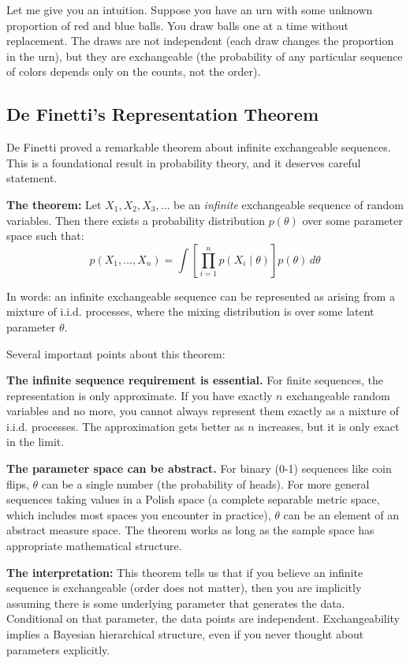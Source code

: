 Let me give you an intuition. Suppose you have an urn with some unknown proportion of red and blue balls. You draw balls one at a time without replacement. The draws are not independent (each draw changes the proportion in the urn), but they are exchangeable (the probability of any particular sequence of colors depends only on the counts, not the order).

\subsection{De Finetti's Representation Theorem}

De Finetti proved a remarkable theorem about infinite exchangeable sequences. This is a foundational result in probability theory, and it deserves careful statement.

\textbf{The theorem:} Let $X_1, X_2, X_3, \ldots$ be an \emph{infinite} exchangeable sequence of random variables. Then there exists a probability distribution $p(\theta)$ over some parameter space such that:
\begin{equation}
p(X_1, \ldots, X_n) = \int \left[\prod_{i=1}^{n} p(X_i \mid \theta)\right] p(\theta) \, d\theta
\end{equation}

In words: an infinite exchangeable sequence can be represented as arising from a mixture of i.i.d. processes, where the mixing distribution is over some latent parameter $\theta$.

Several important points about this theorem:

\textbf{The infinite sequence requirement is essential.} For finite sequences, the representation is only approximate. If you have exactly $n$ exchangeable random variables and no more, you cannot always represent them exactly as a mixture of i.i.d. processes. The approximation gets better as $n$ increases, but it is only exact in the limit.

\textbf{The parameter space can be abstract.} For binary (0-1) sequences like coin flips, $\theta$ can be a single number (the probability of heads). For more general sequences taking values in a Polish space (a complete separable metric space, which includes most spaces you encounter in practice), $\theta$ can be an element of an abstract measure space. The theorem works as long as the sample space has appropriate mathematical structure.

\textbf{The interpretation:} This theorem tells us that if you believe an infinite sequence is exchangeable (order does not matter), then you are implicitly assuming there is some underlying parameter that generates the data. Conditional on that parameter, the data points are independent. Exchangeability implies a Bayesian hierarchical structure, even if you never thought about parameters explicitly.

